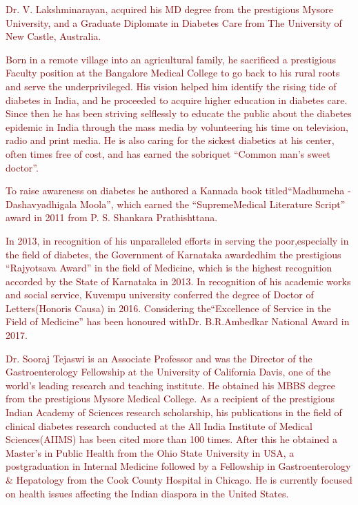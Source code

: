 \thispagestyle{empty}

{\small
{}

\textcolor{maroon}{Dr. V. Lakshminarayan, acquired his MD degree from the prestigious Mysore University, and a Graduate Diplomate in Diabetes Care from The University of New Castle, Australia.}

\textcolor{maroon}{Born in a remote village into an agricultural family, he sacrificed a prestigious Faculty position at the Bangalore Medical College to go back to his rural roots and serve the underprivileged. His vision helped him identify the rising tide of diabetes in India, and he proceeded to acquire higher education in diabetes care. Since then he has been striving selflessly to educate the public about the diabetes epidemic in India through the mass media by volunteering his time on television, radio and print media. He is also caring for the sickest diabetics at his center, often times free of cost, and has earned the sobriquet “Common man’s sweet doctor”.}

\textcolor{maroon}{To raise awareness on diabetes he authored a Kannada book titled\break “Madhumeha - Dashavyadhigala Moola”, which earned the “Supreme\break Medical Literature Script” award in 2011 from P. S. Shankara Prathishttana.}

\textcolor{maroon}{In 2013, in recognition of his unparalleled efforts in serving the poor,\break especially in the field of diabetes, the Government of Karnataka awarded\break him the prestigious “Rajyotsava Award” in the field of Medicine, which is the highest recognition accorded by the State of Karnataka in 2013. In recogni\-tion of his academic works and social service, Kuvempu university conferred the degree of Doctor of Letters(Honoris Causa) in 2016. Considering the\break “Excellence of Service in the Field of Medicine” has been honoured with\break Dr. B.R.Ambedkar National Award in 2017.}


\textcolor{maroon}{Dr. Sooraj Tejaswi is an Associate Professor and was the Director of the Gastroenterology Fellowship at the University of California Davis, one of the world’s leading research and teaching institute. He obtained his MBBS degree from the prestigious Mysore Medical College. As a recipient of the prestigious Indian Academy of Sciences research scholarship, his publications in the field of clinical diabetes research conducted at the All India Institute of Medical Sciences\break (AIIMS) has been cited more than 100 times. After this he obtained a Master’s in Public Health from the Ohio State University in USA, a postgraduation in Internal Medicine followed by a Fellowship in Gastroenterology \& Hepatology from the Cook County Hospital in Chicago. He is currently focused on health issues affecting the Indian diaspora in the United States.}

}

